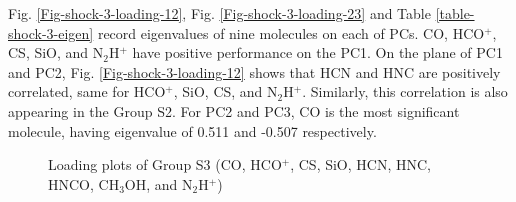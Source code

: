 \documentclass{aa}
\begin{document}
\begin{CJK*}{UTF8}{gbsn}
    Fig. \ref{Fig-shock-3-loading-12}, Fig. \ref{Fig-shock-3-loading-23} and Table \ref{table-shock-3-eigen} record eigenvalues of nine molecules on each of PCs. CO, HCO$^+$, CS, SiO, and N$_2$H$^+$ have positive performance on the PC1. 
    On the plane of PC1 and PC2, Fig. \ref{Fig-shock-3-loading-12} shows that HCN and HNC are positively correlated, same for HCO$^+$, SiO, CS, and N$_2$H$^+$. Similarly, this correlation is also appearing in the Group S2. 
    For PC2 and PC3, CO is the most significant molecule, having eigenvalue of 0.511 and -0.507 respectively. 

     \begin{figure}[htbp]
        \centering  
        \caption{Loading plots of Group S3 (CO, HCO$^+$, CS, SiO, HCN, HNC, HNCO, CH$_3$OH, and N$_2$H$^+$)}
        \label{Fig-shock-3-loading}
    \end{figure}



\end{CJK*}
\end{document}
